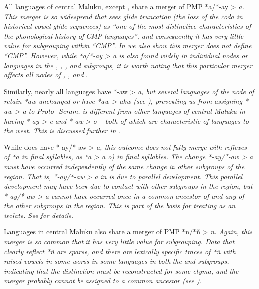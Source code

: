 All languages of central Maluku,
except , share a merger of PMP *a/*-ay > \it{a}.
This merger is so widespread that \citet[264]{Blust1993} sees
glide truncation (the loss of the coda in historical vowel-glide
sequences) as “one of the most distinctive characteristics of
the phonological history of CMP languages”,
and consequently it has very little value for subgrouping within “CMP”.
In  we also show this merger does not define “CMP”.
However, while *a/*-ay > \it{a} is also found widely in individual
nodes or languages in the ,
, , and 
subgroups, it is worth noting that this particular merger affects
all nodes of , , and .

Similarly, nearly all languages have *-aw > \it{a},
but several languages of the  node of 
retain *aw unchanged or have *aw > \it{akw} (see ),
preventing us from assigning *-aw > \it{a} to Proto--Seram.
 is different from other languages of central Maluku
in having *-ay > \it{e}
and *-aw > \it{o} -- both of which are characteristic of 
languages to the west.
This is discussed further in .

While  does have *-ay/*-aw > \it{a},
this outcome does not fully merge with reflexes of *a in final
syllables, as *a > \it{a {\tl} o}) in final syllables.
The change \mbox{*-ay/*-aw} > \it{a} must have occurred independently
of the same change in other subgroups of the region.
That is, *-ay/*-aw > \it{a} in  is due to parallel development.
This parallel development may have been due to contact with other
subgroups in the region,
but *-ay/*-aw > \it{a} cannot have occurred once in a common
ancestor of  and any of the other subgroups in the region.
This is part of the basis for treating  as an isolate.
See  for details.

Languages in central Maluku also share a merger of PMP *n/*ñ > \it{n}.
Again, this merger is so common that it has very little value for subgrouping.
Data that clearly reflect *ñ are sparse,
and there are lexically specific traces of *ñ with raised vowels
in some words in some languages in both the 
and  subgroups, indicating that the distinction
must be reconstructed for some etyma, and the merger probably
cannot be assigned to a common ancestor (see ).

